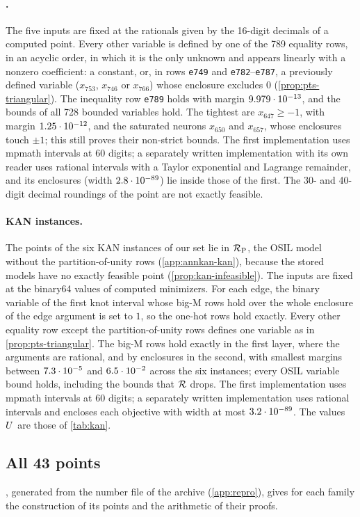 \paragraph{.}
The five inputs are fixed at the rationals given by the 16-digit decimals of a computed point.
Every other variable is defined by one of the 789 equality rows, in an acyclic order, in which it is the only unknown and appears linearly with a nonzero coefficient: a constant, or, in rows \texttt{e749} and \texttt{e782}--\texttt{e787}, a previously defined variable ($x_{753}$, $x_{746}$ or $x_{766}$) whose enclosure excludes $0$ (\cref{prop:pts-triangular}).
The inequality row \texttt{e789} holds with margin $9.979\cdot 10^{-13}$, and the bounds of all 728 bounded variables hold.
The tightest are $x_{647}\ge-1$, with margin $1.25\cdot 10^{-12}$, and the saturated neurons $x_{650}$ and $x_{657}$, whose enclosures touch $\pm1$; this still proves their non-strict bounds.
The first implementation uses mpmath intervals at 60 digits; a separately written implementation with its own reader uses rational intervals with a Taylor exponential and Lagrange remainder, and its enclosures (width $2.8\cdot 10^{-89}$) lie inside those of the first.
The 30- and 40-digit decimal roundings of the point are not exactly feasible.

\paragraph{KAN instances.}
The points of the six KAN instances of our set lie in $\mathcal{R}_{\mathrm{P}}$, the OSIL model without the partition-of-unity rows (\cref{app:annkan-kan}), because the stored models have no exactly feasible point (\cref{prop:kan-infeasible}).
The inputs are fixed at the binary64 values of computed minimizers.
For each edge, the binary variable of the first knot interval whose big-M rows hold over the whole enclosure of the edge argument is set to $1$, so the one-hot rows hold exactly.
Every other equality row except the partition-of-unity rows defines one variable as in \cref{prop:pts-triangular}.
The big-M rows hold exactly in the first layer, where the arguments are rational, and by enclosures in the second, with smallest margins between $7.3\cdot 10^{-5}$ and $6.5\cdot 10^{-2}$ across the six instances; every OSIL variable bound holds, including the bounds that $\mathcal{R}$ drops.
The first implementation uses mpmath intervals at 60 digits; a separately written implementation uses rational intervals and encloses each objective with width at most $3.2\cdot 10^{-89}$.
The values $U$ are those of \cref{tab:kan}.

\subsection{All 43 points}\label{app:points-table}

, generated from the number file of the archive (\cref{app:repro}), gives for each family the construction of its points and the arithmetic of their proofs.


